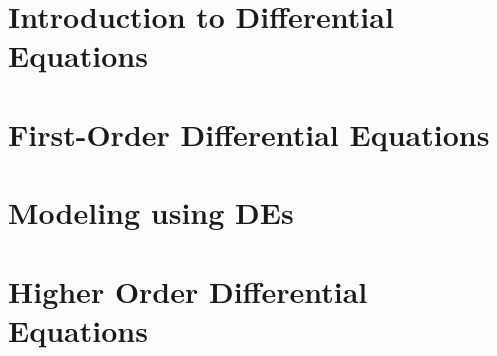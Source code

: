 \documentclass[12pt]{report}
\begin{document}
\maketitle
\tableofcontents

\chapter[Introduction to Diff-Eq]{Introduction to Differential Equations}\label{ch:introduction-to-differential-equations}

\chapter{First-Order Differential Equations}\label{ch:first-order-differential-equations}

\chapter{Modeling using DEs}\label{ch:modeling-using-des}

\chapter[Higher Order DE{s}]{Higher Order Differential Equations}\label{ch:higher-order-differential-equations}
\end{document}
